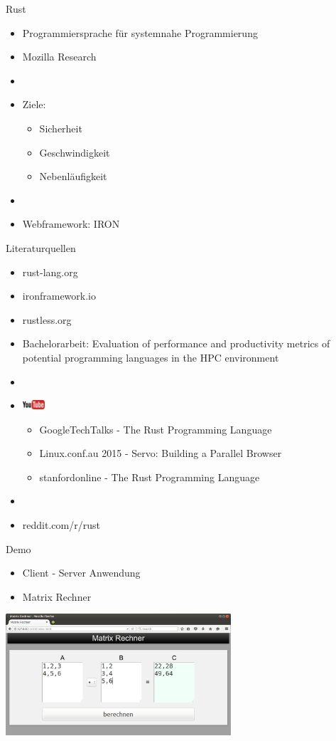 \documentclass[12pt]{beamer}
\begin{document}
\begin{frame}{Rust}
	\begin{itemize}
	  \item Programmiersprache für systemnahe Programmierung 
	  \item Mozilla Research
	  \item[]
	  \item Ziele:
	  \begin{itemize}
	    \item Sicherheit
	    \item Geschwindigkeit
	    \item Nebenläufigkeit
	  \end{itemize}
	  \item[]
	  \item Webframework: IRON 
	\end{itemize}
\end{frame}

\begin{frame}{Literaturquellen}
	\begin{itemize}
	  \item rust-lang.org
	  \item ironframework.io
	  \item rustless.org
	  \item \footnotesize Bachelorarbeit:  Evaluation of performance and productivity metrics of potential programming languages in the HPC environment
	  \item[]
	  \item \includegraphics[height=3.5mm]{youtube_logo.eps}
	  	\begin{itemize}
	  	  \item GoogleTechTalks - The Rust Programming Language
	  	  \item Linux.conf.au 2015 - Servo: Building a Parallel Browser
	  	  \item stanfordonline - The Rust Programming Language 
	  	\end{itemize}
	  	\item[]
	  \item reddit.com/r/rust
	\end{itemize}
\end{frame}

\begin{frame}{Demo}
	\begin{itemize}
	  \item Client - Server Anwendung
	  \item Matrix Rechner
	\end{itemize}
	\begin{center}
		\includegraphics[height=4.5cm]{demo.jpg}
	\end{center}
\end{frame}
\end{document}
